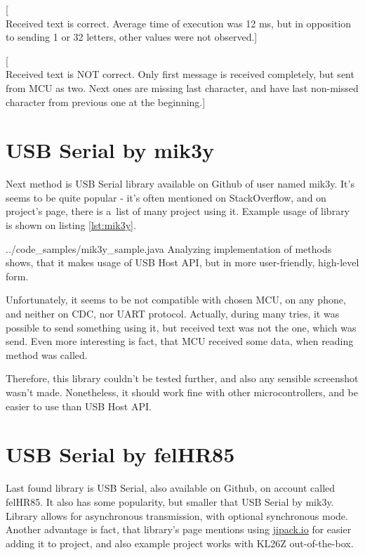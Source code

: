 [\\Received text is correct. 
Average time of execution was 12 ms, but in opposition to sending 1 or 32
letters, other values were not observed.]

[\\Received text is NOT correct. 
Only first message is received completely, but sent from MCU as two.
Next ones are missing last character, and have last non-missed character from
previous one at the beginning.]

\clearpage

\section{USB Serial by mik3y}
Next method is USB Serial library available on Github of user named mik3y.
It's seems to be quite popular - it's often mentioned on StackOverflow, and on
project's page, there is a~list of many project using it.
Example usage of library is shown on listing \ref{lst:mik3y}.

{../code_samples/mik3y_sample.java}
Analyzing implementation of methods shows, that it makes usage of USB Host API,
but in more user-friendly, high-level form.

Unfortunately, it seems to be not compatible with chosen MCU, on any phone, and
neither on CDC, nor UART protocol.
Actually, during many tries, it was possible to send something using it, but
received text was not the one, which was send. 
Even more interesting is fact, that MCU received some data, when reading method
was called.

Therefore, this library couldn't be tested further, and also any sensible
screenshot wasn't made.
Nonetheless, it should work fine with other microcontrollers, and be easier to
use than USB Host API.

\clearpage

\section{USB Serial by felHR85}
Last found library is USB Serial, also available on Github, on account called
felHR85.
It also has some popularity, but smaller that USB Serial by mik3y.
Library allows for asynchronous transmission, with optional synchronous mode.
Another advantage is fact, that library's page mentions using \url{jipack.io}
for easier adding it to project, and also example project works with KL26Z
out-of-the-box.

